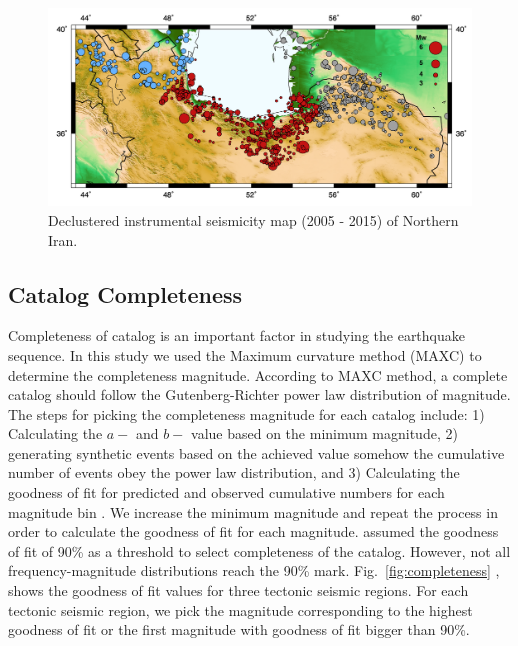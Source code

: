 \begin{figure} [ht]
\centering
\includegraphics[scale=0.6]{figures/pdf/Figure02.pdf} 
\caption{Declustered instrumental seismicity map (2005 - 2015) of Northern Iran.}
\label{fig:seismicity}
\end{figure}


\subsection{Catalog Completeness}
\noindent
Completeness of catalog is an important factor in studying the earthquake sequence.  In this study we used the Maximum curvature method (MAXC) \citep{Wiemer2000} to determine the completeness magnitude. According to MAXC method, a complete catalog should follow the Gutenberg-Richter power law distribution of magnitude. The steps for picking the completeness magnitude for each catalog include: 1) Calculating the $a-$ and $b-$ value based on the minimum magnitude, 2) generating  synthetic events based on the achieved value somehow the cumulative number of events obey the power law distribution, and 3) Calculating the goodness of fit for predicted and observed cumulative numbers for each magnitude bin \citep{Wiemer2000}. We increase the minimum magnitude and repeat the process in order to calculate the goodness of fit for each magnitude. \citet{Wiemer2000} assumed the goodness of fit of 90\% as a threshold to select completeness of the catalog. However,  not all frequency-magnitude distributions reach the 90\% mark. Fig.~\ref{fig:completeness} , shows the goodness of fit values for three tectonic seismic regions. For each tectonic seismic region, we pick the magnitude corresponding to the highest goodness of fit or the first magnitude with goodness of fit bigger than 90\%.

